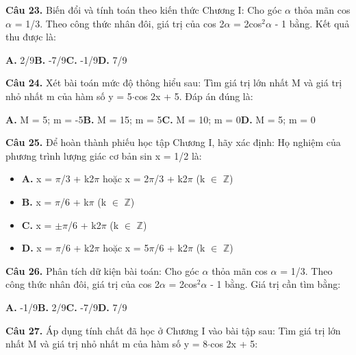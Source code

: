 \documentclass[11pt,a4paper]{article}
\begin{document}
\textbf{\color{primary} Câu 23.} Biến đổi và tính toán theo kiến thức Chương I: Cho góc $\alpha$ thỏa mãn cos $\alpha$ = 1/3. Theo công thức nhân đôi, giá trị của cos 2$\alpha$ = 2cos$^2$$\alpha$ - 1 bằng. Kết quả thu được là:\par
\hspace*{1.5em}\textbf{A.} 2/9\quad\quad \textbf{B.} -7/9\quad\quad \textbf{C.} -1/9\quad\quad \textbf{D.} 7/9\par\vspace{2pt}
\textbf{\color{primary} Câu 24.} Xét bài toán mức độ thông hiểu sau: Tìm giá trị lớn nhất M và giá trị nhỏ nhất m của hàm số y = 5$\cdot$cos 2x + 5. Đáp án đúng là:\par
\hspace*{1.5em}\textbf{A.} M = 5; m = -5\quad\quad \textbf{B.} M = 15; m = 5\quad\quad \textbf{C.} M = 10; m = 0\quad\quad \textbf{D.} M = 5; m = 0\par\vspace{2pt}
\textbf{\color{primary} Câu 25.} Để hoàn thành phiếu học tập Chương I, hãy xác định: Họ nghiệm của phương trình lượng giác cơ bản sin x = 1/2 là:\par
\begin{itemize}\setlength{\itemsep}{1pt}\setlength{\parskip}{0pt}
  \item[] \textbf{A.} x = $\pi$/3 + k2$\pi$ hoặc x = 2$\pi$/3 + k2$\pi$ (k $\in$ $\mathbb{Z}$)
  \item[] \textbf{B.} x = $\pi$/6 + k$\pi$ (k $\in$ $\mathbb{Z}$)
  \item[] \textbf{C.} x = $\pm$$\pi$/6 + k2$\pi$ (k $\in$ $\mathbb{Z}$)
  \item[] \textbf{D.} x = $\pi$/6 + k2$\pi$ hoặc x = 5$\pi$/6 + k2$\pi$ (k $\in$ $\mathbb{Z}$)
\end{itemize}\vspace{2pt}
\textbf{\color{primary} Câu 26.} Phân tích dữ kiện bài toán: Cho góc $\alpha$ thỏa mãn cos $\alpha$ = 1/3. Theo công thức nhân đôi, giá trị của cos 2$\alpha$ = 2cos$^2$$\alpha$ - 1 bằng. Giá trị cần tìm bằng:\par
\hspace*{1.5em}\textbf{A.} -1/9\quad\quad \textbf{B.} 2/9\quad\quad \textbf{C.} -7/9\quad\quad \textbf{D.} 7/9\par\vspace{2pt}
\textbf{\color{primary} Câu 27.} Áp dụng tính chất đã học ở Chương I vào bài tập sau: Tìm giá trị lớn nhất M và giá trị nhỏ nhất m của hàm số y = 8$\cdot$cos 2x + 5:\par
\end{document}
